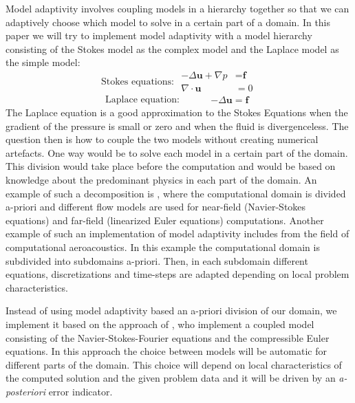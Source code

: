 \documentclass[12pt,a4paper]{article}
\theoremstyle{definition}
\begin{document}
Model adaptivity involves coupling models in a hierarchy together so that we can adaptively choose which model to solve in a certain part of a domain.  In this paper we will try to implement model adaptivity with a model hierarchy consisting of the Stokes model as the complex model and the Laplace model as the simple model:
\begin{equation}
\text{Stokes equations: }
\begin{aligned}
	-\Delta\textbf{u} + \nabla p &= \textbf{f}\nonumber \\ 
\nabla\cdot \textbf{u}&= 0\nonumber
\end{aligned}
\end{equation}
\begin{equation}
\text{Laplace equation: }\quad\quad\,\,\,
\begin{aligned}
-\Delta\textbf{u} = \textbf{f} \nonumber
\end{aligned}
\end{equation}
The Laplace equation is a good approximation to the Stokes Equations when the gradient of the pressure is small or zero and when the fluid is divergenceless.   The question then is how to couple the two models without creating numerical artefacts. One way would be to solve each model in a certain part of the domain.  This division would take place before the computation and would be based on knowledge about the predominant physics in each part of the domain.  An example of such a decomposition is \cite{coclici2001analysis}, where the computational domain is divided a-priori and different flow models are used for near-field (Navier-Stokes equations) and far-field (linearized Euler equations) computations.  Another example of such an implementation of model adaptivity includes \cite{utzmann2006heterogeneous} from the field of computational aeroacoustics. In this example the computational domain is subdivided into subdomains a-priori.  Then, in each subdomain different equations, discretizations and time-steps are adapted depending on local problem characteristics.  

Instead of using model adaptivity based an a-priori division of our domain, we implement it based on the approach of \cite{giesselmann2017posteriori}, who implement a coupled model consisting of the Navier-Stokes-Fourier equations and the compressible Euler equations.   In this approach  the choice between models will be automatic for different parts of the domain.  This choice will depend on local characteristics of the computed solution and the given problem data and it will be driven by an \emph{a-posteriori} error indicator.  
\end{document}
